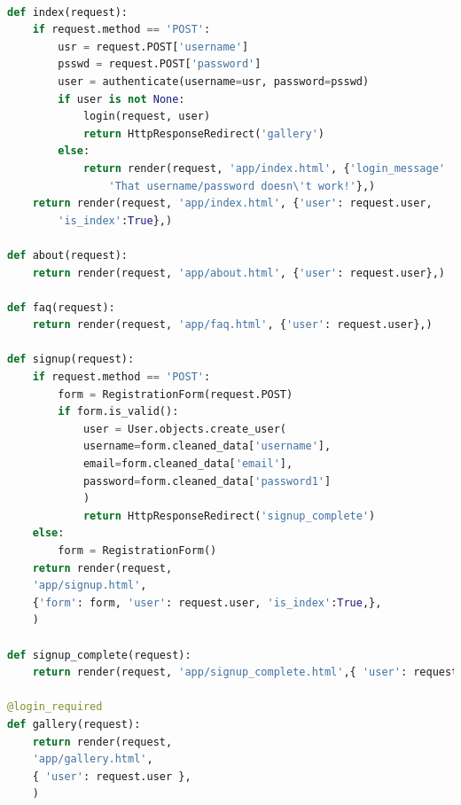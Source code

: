 \documentclass[onecolumn, draftclsnofoot,10pt, compsoc]{IEEEtran}
\begin{document}
\begin{flushleft}
\begin{lstlisting}[language=python]
 
def index(request):
    if request.method == 'POST':
        usr = request.POST['username']
        psswd = request.POST['password']
        user = authenticate(username=usr, password=psswd)
        if user is not None:
            login(request, user)
            return HttpResponseRedirect('gallery')
        else:
            return render(request, 'app/index.html', {'login_message' :
                'That username/password doesn\'t work!'},)
    return render(request, 'app/index.html', {'user': request.user,
        'is_index':True},)
 
def about(request):
    return render(request, 'app/about.html', {'user': request.user},)
 
def faq(request):
    return render(request, 'app/faq.html', {'user': request.user},)
 
def signup(request):
    if request.method == 'POST':
        form = RegistrationForm(request.POST)
        if form.is_valid():
            user = User.objects.create_user(
            username=form.cleaned_data['username'],
            email=form.cleaned_data['email'],
            password=form.cleaned_data['password1']
            )
            return HttpResponseRedirect('signup_complete')
    else:
        form = RegistrationForm()
    return render(request,
    'app/signup.html',
    {'form': form, 'user': request.user, 'is_index':True,},
    )
 
def signup_complete(request):
    return render(request, 'app/signup_complete.html',{ 'user': request.user },)
 
@login_required
def gallery(request):
    return render(request,
    'app/gallery.html',
    { 'user': request.user },
    )
 

\end{lstlisting}
\end{flushleft}
\end{document}

